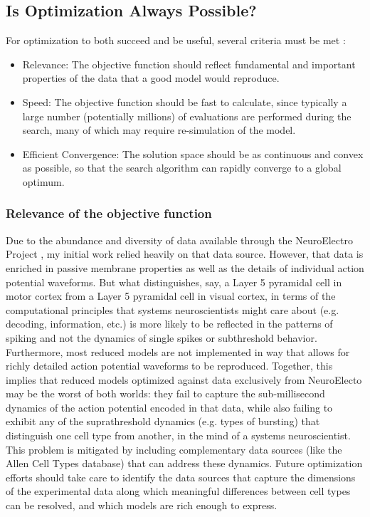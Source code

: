 \subsection{Is Optimization Always Possible?} 
For optimization to both succeed and be useful, several criteria must be met \cite{van2007neurofitter}:
\begin{itemize}
\item Relevance: The objective function should reflect fundamental and important properties of the data that a good model would reproduce.
\item Speed: The objective function should be fast to calculate, since typically a large number (potentially millions) of evaluations are performed during the search, many of which may require re-simulation of the model.
\item Efficient Convergence: The solution space should be as continuous and convex as possible, so that the search algorithm can rapidly converge to a global optimum.
\end{itemize}


\subsubsection{Relevance of the objective function}
Due to the abundance and diversity of data available through the NeuroElectro Project \cite{tripathy2014neuroelectro}, my initial work relied heavily on that data source.
However, that data is enriched in passive membrane properties as well as the details of individual action potential waveforms.
But what distinguishes, say, a Layer 5 pyramidal cell in motor cortex from a Layer 5 pyramidal cell in visual cortex, in terms of the computational principles that systems neuroscientists might care about (e.g. decoding, information, etc.) is more likely to be reflected in the patterns of spiking and not the dynamics of single spikes or subthreshold behavior.
Furthermore, most reduced models are not implemented in way that allows for richly detailed action potential waveforms to be reproduced.
Together, this implies that reduced models optimized against data exclusively from NeuroElecto may be the worst of both worlds: they fail to capture the sub-millisecond dynamics of the action potential encoded in that data, while also failing to exhibit any of the suprathreshold dynamics (e.g. types of bursting) that distinguish one cell type from another, in the mind of a systems neuroscientist.
This problem is mitigated by including complementary data sources (like the Allen Cell Types database) that can address these dynamics.
Future optimization efforts should take care to identify the data sources that capture the dimensions of the experimental data along which meaningful differences between cell types can be resolved, and which models are rich enough to express.

